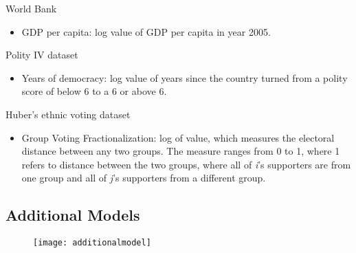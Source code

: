 \documentclass[a4paper, 12pt]{article}
\begin{document}
World Bank
\begin{itemize}
	\item GDP per capita: log value of GDP per capita in year 2005. 
\end{itemize}
Polity IV dataset 
\begin{itemize}
	\item Years of democracy: log value of years since the country turned from a polity score of below 6 to a 6 or above 6. 
\end{itemize}
Huber's\cite{huberMeasuringEthnicVoting2012} ethnic voting dataset
\begin{itemize}
	\item Group Voting Fractionalization: log of value, which measures the electoral distance between any two groups. The measure ranges from 0 to 1, where 1 refers to distance between the two groups, where all of \textit{i}'s supporters are from one group and all of \textit{j}'s supporters from a different group.
\end{itemize}

\subsection{Additional Models}
\begin{figure}[H]
	\centering
	\texttt{[image: additionalmodel]}
\end{figure}



\end{document}

